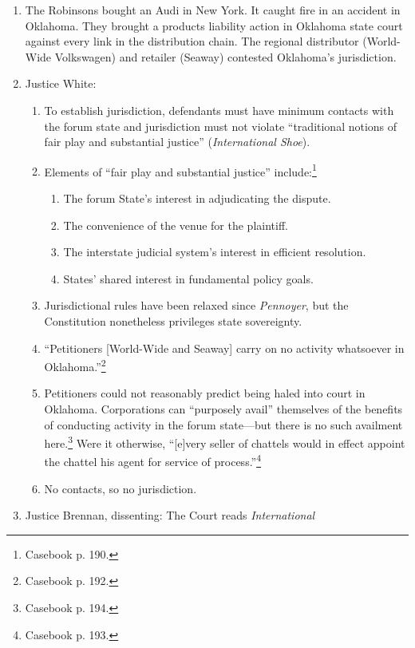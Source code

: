 \begin{enumerate}
    \item The Robinsons bought an Audi in New York. It caught fire in an
    accident in Oklahoma. They brought a products liability action in Oklahoma 
    state court against every link in the distribution chain. The regional 
    distributor (World-Wide Volkswagen) and retailer (Seaway) contested 
    Oklahoma's jurisdiction.
    \item Justice White: \begin{enumerate}
        \item To establish jurisdiction, defendants must have minimum contacts 
        with the forum state and jurisdiction must not violate ``traditional 
        notions of fair play and substantial justice'' (\emph{International 
        Shoe}).
        \item Elements of ``fair play and substantial justice'' 
        include:\footnote{Casebook p. 190.}
        \begin{enumerate}
            \item The forum State's interest in adjudicating the dispute.
            \item The convenience of the venue for the plaintiff.
            \item The interstate judicial system's interest in efficient 
            resolution.
            \item States' shared interest in fundamental policy goals.
        \end{enumerate}
        \item Jurisdictional rules have been relaxed since \emph{Pennoyer}, 
        but the Constitution nonetheless privileges state sovereignty.  \item 
        ``Petitioners [World-Wide and Seaway] carry on no activity whatsoever 
        in Oklahoma.''\footnote{Casebook p. 192.}
        \item Petitioners could not reasonably predict being haled into court 
        in Oklahoma. Corporations can ``purposely avail'' themselves of the 
        benefits of conducting activity in the forum state---but there is no 
        such availment here.\footnote{Casebook p. 194.} Were it otherwise, 
        ``[e]very seller of chattels would in effect appoint the chattel his 
        agent for service of process.''\footnote{Casebook p. 193.}
        \item No contacts, so no jurisdiction.
    \end{enumerate}
    \item Justice Brennan, dissenting: The Court reads \emph{International 
}
\end{enumerate}
